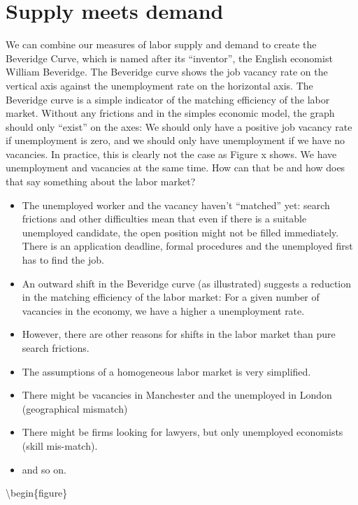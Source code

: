 \documentclass[]{book}
\begin{document}
\hypertarget{supply-meets-demand}{%
\section{Supply meets demand}\label{supply-meets-demand}}

We can combine our measures of labor supply and demand to create the Beveridge Curve, which is named after its ``inventor'', the English economist William Beveridge. The Beveridge curve shows the job vacancy rate on the vertical axis against the unemployment rate on the horizontal axis. The Beveridge curve is a simple indicator of the matching efficiency of the labor market. Without any frictions and in the simples economic model, the graph should only ``exist'' on the axes: We should only have a positive job vacancy rate if unemployment is zero, and we should only have unemployment if we have no vacancies. In practice, this is clearly not the case as Figure x shows. We have unemployment and vacancies at the same time. How can that be and how does that say something about the labor market?

\begin{itemize}
\item
  The unemployed worker and the vacancy haven't ``matched'' yet: search frictions and other difficulties mean that even if there is a suitable unemployed candidate, the open position might not be filled immediately. There is an application deadline, formal procedures and the unemployed first has to find the job.
\item
  An outward shift in the Beveridge curve (as illustrated) suggests a reduction in the matching efficiency of the labor market: For a given number of vacancies in the economy, we have a higher a unemployment rate.
\item
  However, there are other reasons for shifts in the labor market than pure search frictions.
\item
  The assumptions of a homogeneous labor market is very simplified.
\item
  There might be vacancies in Manchester and the unemployed in London (geographical mismatch)
\item
  There might be firms looking for lawyers, but only unemployed economists (skill mis-match).
\item
  and so on.
\end{itemize}

\textbackslash begin\{figure\}
\end{document}
